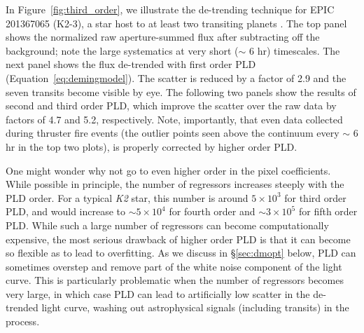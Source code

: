 \documentclass[]{emulateapj}
\begin{document}
In Figure~\ref{fig:third_order}, we illustrate the de-trending technique for EPIC
201367065 (K2-3), a star host to at least two transiting planets \citep{CRO15}. The top
panel shows the normalized raw aperture-summed flux after subtracting off the 
background; note the large systematics at very short ($\sim$ 6 hr) timescales. The
next panel shows the flux de-trended with first order PLD (Equation~\ref{eq:demingmodel}).
The scatter is reduced by a factor of 2.9 and the
seven transits become visible by eye. The following two panels show the results of
second and third order PLD, which improve the scatter over the raw data by factors of 
4.7 and 5.2, respectively. Note, importantly, that even data collected during thruster
fire events (the outlier points seen above the continuum every $\sim$ 6 hr in the top 
two plots), is properly corrected by higher order PLD.

One might wonder why not go to even higher order in the pixel coefficients. While possible in principle,
the number of regressors increases steeply with the PLD order. For a typical \emph{K2} star, this number is
around $5\times 10^3$ for third order PLD, and would increase to $\sim5\times 10^4$ for
fourth order and $\sim3\times 10^5$ for fifth order PLD.
%
%
While such a large number of regressors can become computationally expensive, the 
most serious drawback of higher order PLD is that it can become so flexible as to
lead to overfitting. As we discuss in \S\ref{sec:dmopt} below,
PLD can sometimes overstep and remove part of the white noise component of the 
light curve. This is particularly problematic when the number of regressors becomes very large,
in which case PLD can lead to artificially low scatter in the de-trended light curve,
washing out astrophysical signals (including transits) in the process.
\end{document}
